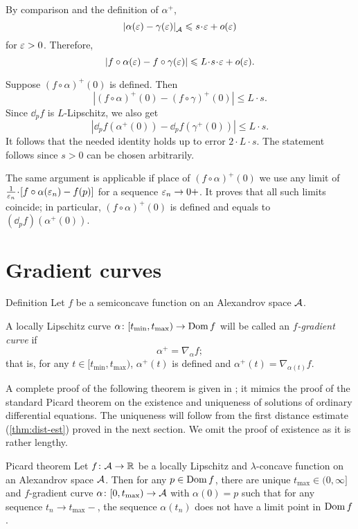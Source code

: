 By comparison and the definition of $\alpha^+$,
\[\dist{\alpha(\eps)}{\gamma(\eps)}{\spc{A}}\le s\cdot\eps+o(\eps)\]
for $\varepsilon>0$.
Therefore,
\[|f\circ\alpha(\eps)-f\circ\gamma(\eps)|\le L\cdot s\cdot\eps+o(\eps).\]

Suppose $(f\circ\alpha)^+(0)$ is defined.
Then
\[|(f\circ\alpha)^+(0)-(f\circ\gamma)^+(0)|\le L\cdot s.\]
Since $\dd_pf$ is $L$-Lipschitz, we also get 
\[|\dd_pf(\alpha^+(0))-\dd_pf(\gamma^+(0))|\le L\cdot s.\]
It follows that the needed identity holds up to error $2\cdot L\cdot s$.
The statement follows since $s>0$ can be chosen arbitrarily.

The same argument is applicable if place of $(f\circ\alpha)^+(0)$
we use any limit of $\tfrac1{\eps_n}\cdot [f\circ\alpha(\eps_n)-f(p)]$ for a sequence $\varepsilon_n\to 0+$.
It proves that all such limits coincide; in particular, $(f\circ\alpha)^+(0)$ is defined and equals to $(\dd_pf)(\alpha^+(0))$.
\qeds


\section{Gradient curves}

\begin{thm}{Definition}\label{def:grad-curve}
Let $f$ be a semiconcave function on an Alexandrov space $\mathcal{A}$.

A locally Lipschitz curve $\alpha\colon[t_{\min},t_{\max})\to\mathop{\rm Dom}\nolimits f$ will be called an \emph{$f$-gradient curve} if
\[\alpha^+=\nabla_{\alpha} f;\]
that is, for any $t\in[t_{\min},t_{\max})$, $\alpha^+(t)$ is defined and 
$\alpha^+(t)=\nabla_{\alpha(t)} f$.
\end{thm}

A complete proof of the following theorem is given in \cite{alexander-kapovitch-petrunin2024}; 
it mimics the proof of the standard Picard theorem on the existence  and uniqueness of solutions of ordinary differential equations.
The uniqueness will follow from the first distance estimate (\ref{thm:dist-est}) proved in the next section.
We omit the proof of existence as it is rather lengthy.

\begin{thm}{Picard theorem}\label{thm:glob-exist-grad-curv}
Let $f\colon\mathcal{A}\to \mathbb{R}$ be a locally Lipschitz and $\lambda$-concave function on an Alexandrov space $\mathcal{A}$.
Then for any $p\in \mathop{\rm Dom}\nolimits f$, there are unique $t_{\max}\in(0,\infty]$ and $f$-gradient curve $\alpha\colon[0,t_{\max})\to \mathcal{A}$ with $\alpha(0)=p$ such that for any sequence $t_n\to t_{\max}-$, the sequence $\alpha(t_n)$ does not have a limit point in $\mathop{\rm Dom}\nolimits f$.
\end{thm}

